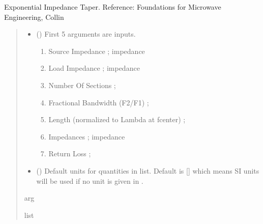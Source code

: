 \documentclass[letterpaper,10pt,english]{sphinxmanual}
\begin{document}
\begin{fulllineitems}
\label{\detokenize{components:components.Exponential_Taper_Impedance_Transformer}}
\pysigstartsignatures
{}
\pysigstopsignatures
\sphinxAtStartPar
Exponential Impedance Taper.
Reference:  Foundations for Microwave Engineering, Collin
\begin{quote}\begin{description}
\begin{itemize}
\item {} 
\sphinxAtStartPar
{} () \textendash{} 
\sphinxAtStartPar
First 5 arguments are inputs.
\begin{enumerate}
%
\item {} 
\sphinxAtStartPar
Source Impedance ; impedance

\item {} 
\sphinxAtStartPar
Load Impedance ; impedance

\item {} 
\sphinxAtStartPar
Number Of Sections ;

\item {} 
\sphinxAtStartPar
Fractional Bandwidth (F2/F1) ;

\item {} 
\sphinxAtStartPar
Length (normalized to Lambda at fcenter) ;

\item {} 
\sphinxAtStartPar
Impedances ; impedance

\item {} 
\sphinxAtStartPar
Return Loss ;

\end{enumerate}


\item {} 
\sphinxAtStartPar
{} (\sphinxstyleliteralemphasis{\sphinxupquote{, }}) \textendash{} Default units for quantities in  list. Default is {[}{]} which means SI units will be used if no unit is given in .

\end{itemize}

\sphinxAtStartPar
arg

\sphinxAtStartPar
list

\end{description}\end{quote}

\end{fulllineitems}
\end{document}
